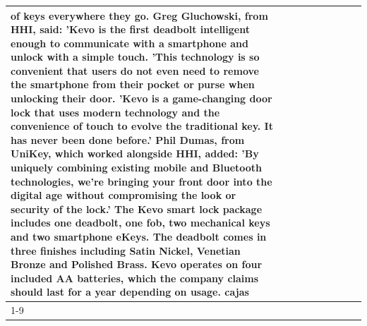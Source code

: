 \begin{table}[H]
\begin{tabular}{lllrlllll}
of keys everywhere they go. Greg Gluchowski, from HHI, said: 'Kevo is the first deadbolt intelligent enough to communicate with a smartphone and unlock with a simple touch. 'This technology is so convenient that users do not even need to remove the smartphone from their pocket or purse when unlocking their door. 'Kevo is a game-changing door lock that uses modern technology and the convenience of touch to evolve the traditional key. It has never been done before.' Phil Dumas, from UniKey, which worked alongside HHI, added: 'By uniquely combining existing mobile and Bluetooth technologies, we’re bringing your front door into the digital age without compromising the look or security of the lock.' The Kevo smart lock package includes one deadbolt, one fob, two mechanical keys and two smartphone eKeys. The deadbolt comes in three finishes including Satin Nickel, Venetian Bronze and Polished Brass. Kevo operates on four included AA batteries, which the company claims should last for a year depending on usage. cajas \\
\cline{1-9}

\end{tabular}
\end{table}
